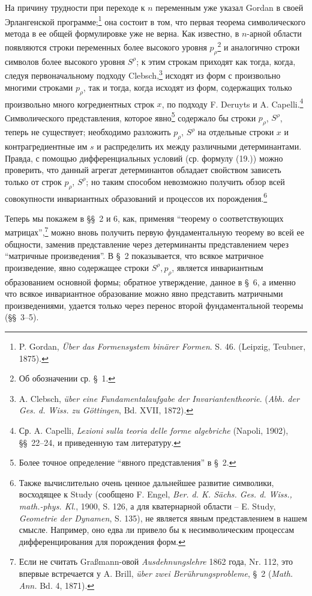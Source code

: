\documentclass[11pt]{article}
\begin{document}
На причину трудности при переходе к $n$ переменным уже указал Gordan в своей Эрлангенской программе;\footnote{P. Gordan, \emph{Über das Formensystem binärer Formen}. S. 46. (Leipzig, Teubner, 1875).} она состоит в том, что первая теорема символического метода в ее общей формулировке уже не верна. Как известно, в $n$-арной области появляются строки переменных более высокого уровня $p_\rho$\footnote{Об обозначении ср. \S\ 1.} и аналогично строки символов более высокого уровня $S^\rho$; к этим строкам приходят как тогда, когда, следуя первоначальному подходу Clebsch,\footnote{A. Clebsch, \emph{über eine Fundamentalaufgabe der Invariantentheorie}. (\emph{Abh. der Ges. d. Wiss. zu Göttingen}, Bd. XVII, 1872).} исходят из форм с произвольно многими строками $p_\rho$, так и тогда, когда исходят из форм, содержащих только произвольно много когредиентных строк $x$, по подходу F. Deruyts и A. Capelli.\footnote{Ср. A. Capelli, \emph{Lezioni sulla teoria delle forme algebriche} (Napoli, 1902), \S\S\ 22--24, и приведенную там литературу.} Символического представления, которое явно\footnote{Более точное определение ``явного представления'' в \S\ 2.} содержало бы строки $p_\rho$, $S^\rho$, теперь не существует; необходимо разложить $p_\rho$, $S^\rho$ на отдельные строки $x$ и контрагредиентные им $s$ и распределить их между различными детерминантами. Правда, с помощью дифференциальных условий (ср. формулу (19.)) можно проверить, что данный агрегат детерминантов обладает свойством зависеть только от строк $p_\rho$, $S^\rho$; но таким способом невозможно получить обзор всей совокупности инвариантных образований и процессов их порождения.\footnote{Также вычислительно очень ценное дальнейшее развитие символики, восходящее к Study (сообщено F. Engel, \emph{Ber. d. K. Sächs. Ges. d. Wiss., math.-phys. Kl.}, 1900, S. 126, а для кватернарной области -- E. Study, \emph{Geometrie der Dynamen}, S. 135), не является явным представлением в нашем смысле. Например, оно едва ли привело бы к несимволическим процессам дифференцирования для порождения форм.}

Теперь мы покажем в \S\S\ 2 и 6, как, применяя ``теорему о соответствующих матрицах'',\footnote{Если не считать Graßmann-овой \emph{Ausdehnungslehre} 1862 года, Nr. 112, это впервые встречается у A. Brill, \emph{über zwei Berührungsprobleme}, \S\ 2 (\emph{Math. Ann.} Bd. 4, 1871).} можно вновь получить первую фундаментальную теорему во всей ее общности, заменив представление через детерминанты представлением через ``матричные произведения''. В \S\ 2 показывается, что всякое матричное произведение, явно содержащее строки $S^\rho,p_\rho$, является инвариантным образованием основной формы; обратное утверждение, данное в \S\ 6, а именно что всякое инвариантное образование можно явно представить матричными произведениями, удается только через перенос второй фундаментальной теоремы (\S\S\ 3--5).
\end{document}
